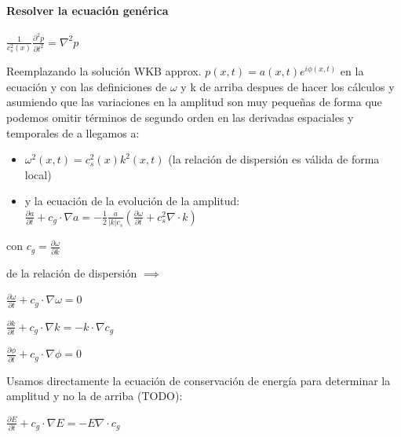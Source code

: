 \documentclass{article}
\begin{document}
\paragraph{Resolver la ecuación genérica}
\begin{description}  
\item $\frac{1}{c_s^{2}(x)} \frac{\partial^{2} p}{\partial t^{2}} = \nabla^{2} p  $
\item Reemplazando la solución WKB approx. $p(x,t) = a(x,t) e^{i \phi(x,t)}$ en la ecuación y con las definiciones de $\omega$ y k de arriba despues 
de hacer los cálculos 
y asumiendo  que las variaciones en la amplitud son muy pequeñas de forma que podemos omitir términos de segundo orden en las derivadas espaciales y temporales de a llegamos a: 
\begin{itemize}
\item $\omega^{2}(x,t) = c_s^{2}(x) k^2(x,t)$ (la relación de dispersión es válida de forma local)
\item y la ecuación de la evolución de la amplitud:
  $\frac{\partial a}{\partial t} + c_g \cdot \nabla a = -\frac{1}{2} \frac{a}{|k| c_s} (\frac{\partial \omega}{\partial t} + c_s^{2}  \nabla \cdot k) $
\end{itemize}
\item con $c_g = \frac{\partial \omega}{\partial k}$ 

\item de la relación de dispersión $\implies $ 
\item$\frac{\partial \omega}{\partial t} + c_g \cdot \nabla \omega = 0 $
\item$\frac{\partial k}{\partial t} + c_g \cdot \nabla k = -k \cdot \nabla  c_g $
\item$\frac{\partial \phi}{\partial t} + c_g \cdot \nabla \phi = 0 $

\item Usamos directamente la ecuación de conservación de energía para determinar la amplitud y no la de arriba (TODO):
\item$\frac{\partial E}{\partial t} + c_g \cdot \nabla E = -E \nabla \cdot c_g $

\end{description}
\end{document}
